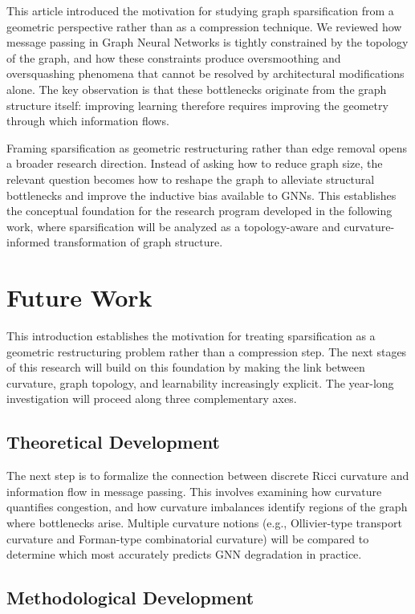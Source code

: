 \documentclass[letterpaper,12pt]{article}
\begin{document}
This article introduced the motivation for studying graph sparsification from a geometric perspective rather than as a compression technique. We reviewed how message passing in Graph Neural Networks is tightly constrained by the topology of the graph, and how these constraints produce oversmoothing and oversquashing phenomena that cannot be resolved by architectural modifications alone. The key observation is that these bottlenecks originate from the graph structure itself: improving learning therefore requires improving the geometry through which information flows.

Framing sparsification as geometric restructuring rather than edge removal opens a broader research direction. Instead of asking how to reduce graph size, the relevant question becomes how to reshape the graph to alleviate structural bottlenecks and improve the inductive bias available to GNNs. This establishes the conceptual foundation for the research program developed in the following work, where sparsification will be analyzed as a topology-aware and curvature-informed transformation of graph structure.

\section{Future Work}

This introduction establishes the motivation for treating sparsification as a geometric restructuring problem rather than a compression step. The next stages of this research will build on this foundation by making the link between curvature, graph topology, and learnability increasingly explicit. The year-long investigation will proceed along three complementary axes.

\subsection{Theoretical Development}

The next step is to formalize the connection between discrete Ricci curvature and information flow in message passing. This involves examining how curvature quantifies congestion, and how curvature imbalances identify regions of the graph where bottlenecks arise. Multiple curvature notions (e.g., Ollivier-type transport curvature and Forman-type combinatorial curvature) will be compared to determine which most accurately predicts GNN degradation in practice.

\subsection{Methodological Development}
\end{document}
